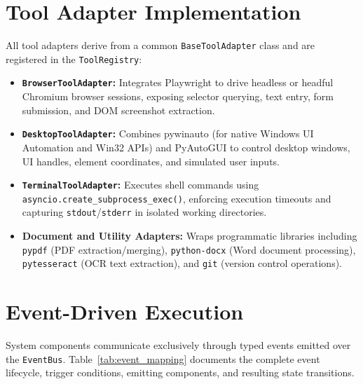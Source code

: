 \documentclass[conference]{IEEEtran}
\begin{document}
\section{Tool Adapter Implementation}
\label{sec:adapters}
All tool adapters derive from a common \texttt{BaseToolAdapter} class and are registered in the \texttt{ToolRegistry}:
\begin{itemize}
    \item \textbf{\texttt{BrowserToolAdapter}:} Integrates Playwright to drive headless or headful Chromium browser sessions, exposing selector querying, text entry, form submission, and DOM screenshot extraction.
    \item \textbf{\texttt{DesktopToolAdapter}:} Combines pywinauto (for native Windows UI Automation and Win32 APIs) and PyAutoGUI to control desktop windows, UI handles, element coordinates, and simulated user inputs.
    \item \textbf{\texttt{TerminalToolAdapter}:} Executes shell commands using \texttt{asyncio.create\_subprocess\_exec()}, enforcing execution timeouts and capturing \texttt{stdout}/\texttt{stderr} in isolated working directories.
    \item \textbf{Document and Utility Adapters:} Wraps programmatic libraries including \texttt{pypdf} (PDF extraction/merging), \texttt{python-docx} (Word document processing), \texttt{pytesseract} (OCR text extraction), and \texttt{git} (version control operations).
\end{itemize}

\section{Event-Driven Execution}
\label{sec:events}
System components communicate exclusively through typed events emitted over the \texttt{EventBus}. Table~\ref{tab:event_mapping} documents the complete event lifecycle, trigger conditions, emitting components, and resulting state transitions.
\end{document}
